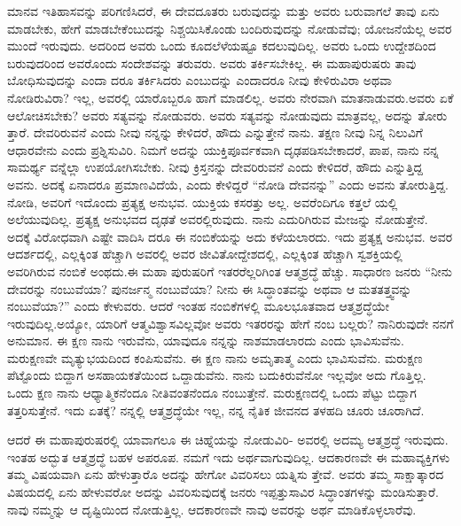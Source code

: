 ಮಾನವ ಇತಿಹಾಸವನ್ನು ಪರಿಗಣಿಸಿದರೆ, ಈ ದೇವದೂತರು ಬರುವುದನ್ನು ಮತ್ತು ಅವರು ಬರುವಾಗಲೆ ತಾವು ಏನು ಮಾಡಬೇಕು, ಹೇಗೆ ಮಾಡಬೇಕೆಂಬುದನ್ನು ನಿಶ್ಚಯಿಸಿಕೊಂಡು ಬಂದಿರುವುದನ್ನು ನೋಡುವೆವು; ಯೋಜನೆಯೆಲ್ಲ ಅವರ ಮುಂದೆ ಇರುವುದು. ಅದರಿಂದ ಅವರು ಒಂದು ಕೂದಲೆಳೆಯಷ್ಟೂ ಕದಲುವುದಿಲ್ಲ. ಅವರು ಒಂದು ಉದ್ದೇಶದಿಂದ ಬರುವುದರಿಂದ ಅವರೊಂದು ಸಂದೇಶವನ್ನು ತರುವರು. ಅವರು ತರ್ಕಿಸಬೇಕಿಲ್ಲ. ಈ ಮಹಾಪುರುಷರು ತಾವು ಬೋಧಿಸುವುದನ್ನು ಎಂದಾ ದರೂ ತರ್ಕಿಸಿದರು ಎಂಬುದನ್ನು ಎಂದಾದರೂ ನೀವು ಕೇಳಿರುವಿರಾ ಅಥವಾ ನೋಡಿರುವಿರಾ? ಇಲ್ಲ, ಅವರಲ್ಲಿ ಯಾರೊಬ್ಬರೂ ಹಾಗೆ ಮಾಡಲಿಲ್ಲ. ಅವರು ನೇರವಾಗಿ ಮಾತನಾಡುವರು.ಅವರು ಏಕೆ ಆಲೋಚಿಸಬೇಕು? ಅವರು ಸತ್ಯವನ್ನು ನೋಡುವರು. ಅವರು ಸತ್ಯವನ್ನು ನೋಡುವುದು ಮಾತ್ರವಲ್ಲ, ಅದನ್ನು ತೋರು ತ್ತಾರೆ. ದೇವರಿರುವನೆ ಎಂದು ನೀವು ನನ್ನನ್ನು ಕೇಳಿದರೆ, ಹೌದು ಎನ್ನುತ್ತೇನೆ ನಾನು. ತಕ್ಷಣ ನೀವು ನಿನ್ನ ನಿಲುವಿಗೆ ಆಧಾರವೇನು ಎಂದು ಪ್ರಶ್ನಿಸುವಿರಿ. ನಿಮಗೆ ಅದನ್ನು ಯುಕ್ತಿಪೂರ್ವಕವಾಗಿ ದೃಢಪಡಿಸಬೇಕಾದರೆ, ಪಾಪ, ನಾನು ನನ್ನ ಸಾಮರ್ಥ್ಯ ವನ್ನೆಲ್ಲಾ ಉಪಯೋಗಿಸಬೇಕು. ನೀವು ಕ್ರಿಸ್ತನನ್ನು ದೇವರಿರುವನೆ ಎಂದು ಕೇಳಿದರೆ, ಹೌದು ಎನ್ನುತ್ತಿದ್ದ ಅವನು. ಅದಕ್ಕೆ ಏನಾದರೂ ಪ್ರಮಾಣವಿದೆಯೆ, ಎಂದು ಕೇಳಿದ್ದರೆ “ನೋಡಿ ದೇವನನ್ನು” ಎಂದು ಅವನು ತೋರುತ್ತಿದ್ದ. ನೋಡಿ, ಅವರಿಗೆ ಇದೊಂದು ಪ್ರತ್ಯಕ್ಷ ಅನುಭವ. ಯುಕ್ತಿಯ ಕಸರತ್ತು ಅಲ್ಲ. ಅವರೆಂದಿಗೂ ಕತ್ತಲೆ ಯಲ್ಲಿ ಅಲೆಯುವುದಿಲ್ಲ. ಪ್ರತ್ಯಕ್ಷ ಅನುಭವದ ದೃಢತೆ ಅವರಲ್ಲಿರುವುದು. ನಾನು ಎದುರಿಗಿರುವ ಮೇಜನ್ನು ನೋಡುತ್ತೇನೆ. ಅದಕ್ಕೆ ವಿರೋಧವಾಗಿ ಎಷ್ಟೇ ವಾದಿಸಿ ದರೂ ಈ ನಂಬಿಕೆಯನ್ನು ಅದು ಕಳೆಯಲಾರದು. ಇದು ಪ್ರತ್ಯಕ್ಷ ಅನುಭವ. ಅವರ ಆದರ್ಶದಲ್ಲಿ, ಎಲ್ಲಕ್ಕಿಂತ ಹೆಚ್ಚಾಗಿ ಅವರಲ್ಲಿ ಅವರ ಜೀವಿತೋದ್ದೇಶದಲ್ಲಿ, ಎಲ್ಲಕ್ಕಿಂತ ಹೆಚ್ಚಾಗಿ ಸ್ವಶಕ್ತಿಯಲ್ಲಿ ಅವರಿಗಿರುವ ನಂಬಿಕೆ ಅಂಥದು.ಈ ಮಹಾ ಪುರುಷರಿಗೆ ಇತರರೆಲ್ಲರಿಗಿಂತ ಆತ್ಮಶ್ರದ್ಧೆ ಹೆಚ್ಚು. ಸಾಧಾರಣ ಜನರು “ನೀನು ದೇವರನ್ನು ನಂಬುವೆಯಾ? ಪುನರ್ಜನ್ಮ ನಂಬುವೆಯಾ? ನೀನು ಈ ಸಿದ್ಧಾಂತವನ್ನು ಅಥವಾ ಆ ಮತತತ್ತ್ವವನ್ನು ನಂಬುವೆಯಾ?” ಎಂದು ಕೇಳುವರು. ಆದರೆ ಇಂತಹ ನಂಬಿಕೆಗಳಲ್ಲಿ ಮೂಲಭೂತವಾದ ಆತ್ಮಶ್ರದ್ಧೆಯೇ ಇರುವುದಿಲ್ಲ.ಅಯ್ಯೋ, ಯಾರಿಗೆ ಆತ್ಮವಿಶ್ವಾಸವಿಲ್ಲವೋ ಅವರು ಇತರರನ್ನು ಹೇಗೆ ನಂಬ ಬಲ್ಲರು? ನಾನಿರುವುದೇ ನನಗೆ ಅನುಮಾನ. ಈ ಕ್ಷಣ ನಾನು ಇರುವೆನು, ಯಾವುದೂ ನನ್ನನ್ನು ನಾಶಮಾಡಲಾರದು ಎಂದು ಭಾವಿಸುವೆನು. ಮರುಕ್ಷಣವೇ ಮೃತ್ಯುಭಯದಿಂದ ಕಂಪಿಸುವೆನು. ಈ ಕ್ಷಣ ನಾನು ಅಮೃತಾತ್ಮ ಎಂದು ಭಾವಿಸುವೆನು. ಮರುಕ್ಷಣ ಪೆಟ್ಟೊಂದು ಬಿದ್ದಾಗ ಅಸಹಾಯಕತೆಯಿಂದ ಒದ್ದಾಡುವೆನು. ನಾನು ಬದುಕಿರುವೆನೋ ಇಲ್ಲವೋ ಅದು ಗೊತ್ತಿಲ್ಲ. ಒಂದು ಕ್ಷಣ ನಾನು ಆಧ್ಯಾತ್ಮಿಕನೆಂದೂ ನೀತಿವಂತನೆಂದೂ ನಂಬುತ್ತೇನೆ. ಮರುಕ್ಷಣದಲ್ಲಿ ಒಂದು ಪೆಟ್ಟು ಬಿದ್ದಾಗ ತತ್ತರಿಸುತ್ತೇನೆ. ಇದು ಏತಕ್ಕೆ? ನನ್ನಲ್ಲಿ ಆತ್ಮಶ್ರದ್ಧೆಯೇ ಇಲ್ಲ, ನನ್ನ ನೈತಿಕ ಜೀವನದ ತಳಹದಿ ಚೂರು ಚೂರಾಗಿದೆ.

ಆದರೆ ಈ ಮಹಾಪುರುಷರಲ್ಲಿ ಯಾವಾಗಲೂ ಈ ಚಿಹ್ನೆಯನ್ನು ನೋಡುವಿರಿ- ಅವರಲ್ಲಿ ಅದಮ್ಯ ಆತ್ಮಶ್ರದ್ಧೆ ಇರುವುದು. ಇಂತಹ ಅದ್ಭುತ ಆತ್ಮಶ್ರದ್ಧೆ ಬಹಳ ಅಪರೂಪ. ನಮಗೆ ಇದು ಅರ್ಥವಾಗುವುದಿಲ್ಲ. ಆದಕಾರಣವೇ ಈ ಮಹಾವ್ಯಕ್ತಿಗಳು ತಮ್ಮ ವಿಷಯವಾಗಿ ಏನು ಹೇಳುತ್ತಾರೊ ಅದನ್ನು ಹೇಗೋ ವಿವರಿಸಲು ಯತ್ನಿಸು ತ್ತೇವೆ. ಅವರು ತಮ್ಮ ಸಾಕ್ಷಾತ್ಕಾರದ ವಿಷಯದಲ್ಲಿ ಏನು ಹೇಳುವರೋ ಅದನ್ನು ವಿವರಿಸುವುದಕ್ಕೆ ಜನರು ಇಪ್ಪತ್ತುಸಾವಿರ ಸಿದ್ಧಾಂತಗಳನ್ನು ಮಂಡಿಸುತ್ತಾರೆ. ನಾವು ನಮ್ಮನ್ನು ಆ ದೃಷ್ಟಿಯಿಂದ ನೋಡುತ್ತಿಲ್ಲ. ಆದಕಾರಣವೇ ನಾವು ಅವರನ್ನು ಅರ್ಥ ಮಾಡಿಕೊಳ್ಳಲಾರೆವು.

